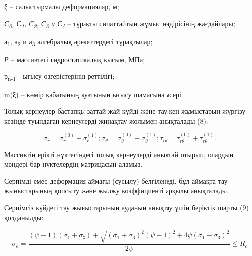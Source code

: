 \begin{multicols}{2}
ξ -- салыстырмалы деформациялар, м;

\emph{С\textsubscript{0}, С\textsubscript{1}, С\textsubscript{2},
С\textsubscript{3} и С\textsubscript{4}} -- тұрақты сипаттайтын жұмыс
өндірісінің жағдайлары;

а\textsubscript{1}, а\textsubscript{2} и а\textsubscript{3} алгебралық
әрекеттердегі тұрақтылар;

\emph{Р} -- массивтегі гидростатикалық қысым, МПа;

р\textsubscript{n-1} - ығысу өзгерістерінің реттілігі;

m(ξ) -- көмір қабатының қуатының ығысу шамасына әсері.

Толық кернеулер бастапқы заттай жай-күйді және тау-кен жұмыстарын
жүргізу кезінде туындаған кернеулерді жинақтау жолымен анықталады (8):
\end{multicols}

\begin{equation}
\sigma_{r} = \sigma_{r}^{(0)} + \sigma_{r}^{(1)};\sigma_{\theta} = \sigma_{\theta}^{(0)} + \sigma_{\theta}^{(1)};\tau_{r\theta} = \tau_{r\theta}^{(0)} + \tau_{r\theta}^{(1)}.
\end{equation}

\begin{multicols}{2}
Массивтің ерікті нүктесіндегі толық кернеулерді анықтай отырып, олардың
мәндері бар нүктелердің матрицасын аламыз.

Серпімді емес деформация аймағы (сусылу) белгіленеді, бұл аймақта тау
жыныстарының қопсыту және жылжу коэффициенті арқылы анықталады.

Серпімсіз күйдегі тау жыныстарының ауданын анықтау үшін беріктік шарты
(9) қолданылды:
\end{multicols}

\begin{equation}
\sigma_{e} = \frac{(\psi - 1)(\sigma_{1} + \sigma_{3}) + \sqrt{(\sigma_{1} + \sigma_{3})^{2}(\psi - 1)^{2} + 4\psi(\sigma_{1} - \sigma_{3})^{2}}}{2\psi} \leq R_{c}
\end{equation}


